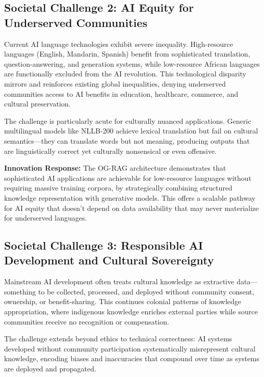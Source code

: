 \documentclass[11pt,a4paper]{article}
\begin{document}
\subsection*{Societal Challenge 2: AI Equity for Underserved Communities}

Current AI language technologies exhibit severe inequality. High-resource languages (English, Mandarin, Spanish) benefit from sophisticated translation, question-answering, and generation systems, while low-resource African languages are functionally excluded from the AI revolution. This technological disparity mirrors and reinforces existing global inequalities, denying underserved communities access to AI benefits in education, healthcare, commerce, and cultural preservation.

The challenge is particularly acute for culturally nuanced applications. Generic multilingual models like NLLB-200 achieve lexical translation but fail on cultural semantics---they can translate words but not meaning, producing outputs that are linguistically correct yet culturally nonsensical or even offensive.

\textbf{Innovation Response:} The OG-RAG architecture demonstrates that sophisticated AI applications are achievable for low-resource languages without requiring massive training corpora, by strategically combining structured knowledge representation with generative models. This offers a scalable pathway for AI equity that doesn't depend on data availability that may never materialize for underserved languages.

\subsection*{Societal Challenge 3: Responsible AI Development and Cultural Sovereignty}

Mainstream AI development often treats cultural knowledge as extractive data---something to be collected, processed, and deployed without community consent, ownership, or benefit-sharing. This continues colonial patterns of knowledge appropriation, where indigenous knowledge enriches external parties while source communities receive no recognition or compensation.

The challenge extends beyond ethics to technical correctness: AI systems developed without community participation systematically misrepresent cultural knowledge, encoding biases and inaccuracies that compound over time as systems are deployed and propagated.
\end{document}
